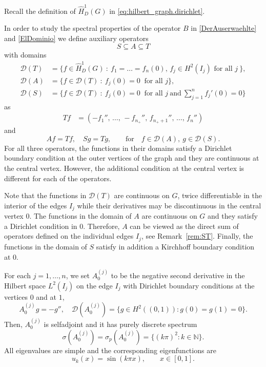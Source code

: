 \documentclass{article}
\numberwithin{equation}{section}
\theoremstyle{definition}
\newcommand{\N}{\mathbb{N}}
\newcommand{\mD}{\mathcal{D}}
\newcommand{\DiffInt}{\Aj_0}  %
\newcommand{\Aj}[1][j]{A^{(#1)}}  %
\newcommand{\AK}{A}
\newcommand{\SK}{S}
\newcommand{\TK}{T}
\newcommand{\eigf}[1]{u_{#1}}  %
\begin{document}
Recall the definition of $\widehat H^1_D(G)$ in \eqref{eq:hilbert_graph.dirichlet}. 

In order to study the spectral properties of the operator $B$ in \eqref{DerAuserwaehlte} and \eqref{ElDominio}
we define auxiliary operators 
\begin{equation*}
   \SK \subseteq \AK \subseteq \TK
\end{equation*}
with domains 
\begin{align}
\label{eq:definition_minimal_operator}
   \mD(\TK ) &= \Big\{ f\in \widehat H^1_D(G) \ :\ f_1 = \dots = f_n(0),\,  
   f_j\in H^2(I_j) \text{ for all }  j\ \Big\},
   \\
   \mD(\AK) &= \{ f\in \mD(\TK) \ :\  f_j(0) = 0\ \text{ for all } j \},
   \\
   \mD(\SK ) &= \Big\{ f\in \mD(\TK) \ :\ f_j(0) = 0\  \text{ for all }  j\ \text{and}\ \sum_{j=1}^n f_j'(0) = 0 \Big\}
\end{align}
as
\begin{align*}
  \TK f & = (-f_1'',\, \dots, \, -f_{n_+}'',\,  f_{n_+ + 1}'',\, \dots, \,  f_n'')
\end{align*}
and
\begin{equation*}
    Af = Tf,\quad
    Sg = Tg,\qquad
    \text{for}\quad f\in\mD(A),\ g\in\mD(S).
\end{equation*}
%
For all three operators, the functions in their domains satisfy a Dirichlet boundary condition at the outer vertices of the graph and they are continuous at the central vertex. 
However, the additional condition at the central vertex is different for each of the operators.

Note that the functions in $\mD(\TK)$ are continuous on $G$, twice differentiable in the interior of the edges $I_j$ while their derivatives may be discontinuous in the central vertex $0$. 
The functions in the domain of $\AK$ are continuous on $G$ and they satisfy a Dirichlet condition in $0$.
Therefore, $A$ can be viewed as the direct sum of operators defined on the individual edges $I_j$, see Remark~\ref{rem:ST}.
Finally, the functions in the domain of $\SK$ satisfy in addition a Kirchhoff boundary condition at $0$.
\smallskip

For each $j= 1, \dots, n$, we set $\Aj_0$ to be the negative second derivative in the Hilbert space $L^2(I_j)$ on the edge $I_j$ with Dirichlet boundary conditions at the vertices $0$ and at $1$,
\begin{equation}
\label{eq:An}
	\DiffInt g = -g'',\quad \mD(\DiffInt) = \{ g\in H^2((0, 1)) : g(0) = g(1) = 0 \}.
\end{equation}
Then, $\DiffInt$ is selfadjoint and it has purely discrete spectrum
\begin{equation}
   \label{eq:Tn:spectrum}
   \sigma(\DiffInt) = \sigma_p(\DiffInt) = \{ (k\pi)^2 : k\in\N \}.
\end{equation}
All eigenvalues are simple and the corresponding eigenfunctions are
\begin{equation}
   \label{eq:uk}
   \eigf{k}(x) = \sin(k\pi x),\qquad x\in [0, 1].
\end{equation}
\end{document}
